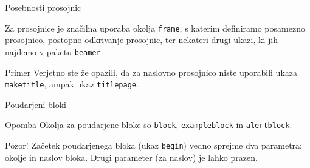 \begin{frame}{Posebnosti prosojnic}

	Za prosojnice je značilna uporaba okolja \texttt{frame},
	s katerim definiramo posamezno prosojnico,
	\pause
	postopno odkrivanje prosojnic,
	\pause
	ter nekateri drugi ukazi, ki jih najdemo v paketu \texttt{beamer}.
	\pause
	\begin{exampleblock}{Primer}
		Verjetno ste že opazili, da za naslovno prosojnico niste uporabili
		ukaza \texttt{maketitle}, ampak ukaz \texttt{titlepage}.
	\end{exampleblock}
\end{frame}

\begin{frame}{Poudarjeni bloki}
			\begin{alertblock}{Opomba}
		Okolja za poudarjene bloke so \texttt{block}, \texttt{exampleblock} in \texttt{alertblock}.
		
	
			\end{alertblock}

			\begin{alertblock}{Pozor!}
				Začetek poudarjenega bloka (ukaz \texttt{begin}) vedno sprejme 
				dva parametra: okolje in naslov bloka.
				Drugi parameter (za naslov) je lahko prazen.
				
			\end{alertblock}
	
			
		 
		
		\end{frame}
		
	
		
	
 

